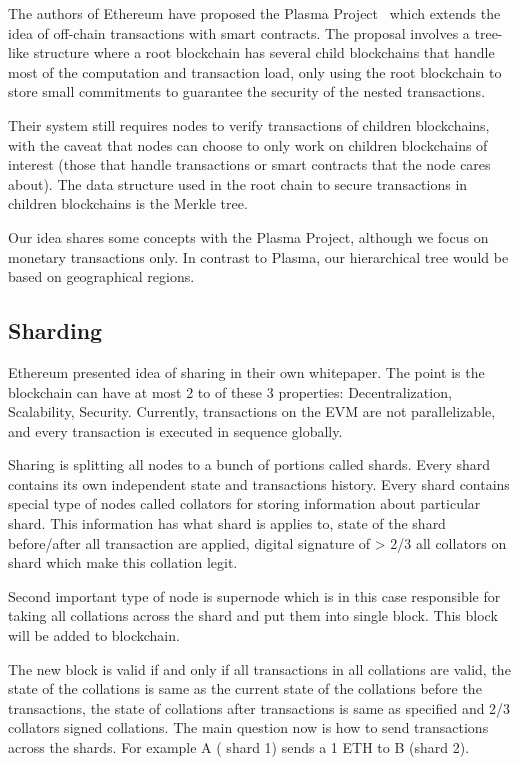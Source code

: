 The authors of Ethereum have proposed the Plasma Project~\cite{plasma} which
extends the idea of off-chain transactions with smart contracts.  The proposal
involves a tree-like structure where a root blockchain has several child
blockchains that handle most of the computation and transaction load, only
using the root blockchain to store small commitments to guarantee the security
of the nested transactions.

Their system still requires nodes to verify transactions of children
blockchains, with the caveat that nodes can choose to only work on children
blockchains of interest (those that handle transactions or smart contracts that
the node cares about).  The data structure used in the root chain to secure
transactions in children blockchains is the Merkle tree.

Our idea shares some concepts with the Plasma Project, although we focus on
monetary transactions only.  In contrast to Plasma, our hierarchical tree would
be based on geographical regions.

\subsection{Sharding}

Ethereum presented idea of sharing in their own whitepaper. The point is the
blockchain can have at most 2 to of these 3 properties: Decentralization,
Scalability, Security. Currently, transactions on the EVM are not
parallelizable, and every transaction is executed in sequence globally.

Sharing is splitting all nodes to a bunch of portions called shards. Every
shard contains its own independent state and transactions history. Every shard
contains special type of nodes called collators for storing information about
particular shard. This information has what shard is applies to, state of the
shard before/after all transaction are applied, digital signature of > 2/3 all
collators on shard which make this collation legit.

Second important type of node is supernode which is in this case responsible
for taking all collations across the shard and put them into single block. This
block will be added to blockchain.

The new block is valid if and only if all transactions in all collations are
valid, the state of the collations is same as the current state of the
collations before the transactions, the state of collations after transactions
is same as specified and 2/3 collators signed collations.  The main question
now is how to send transactions across the shards. For example A ( shard 1)
sends a 1 ETH to B (shard 2).

